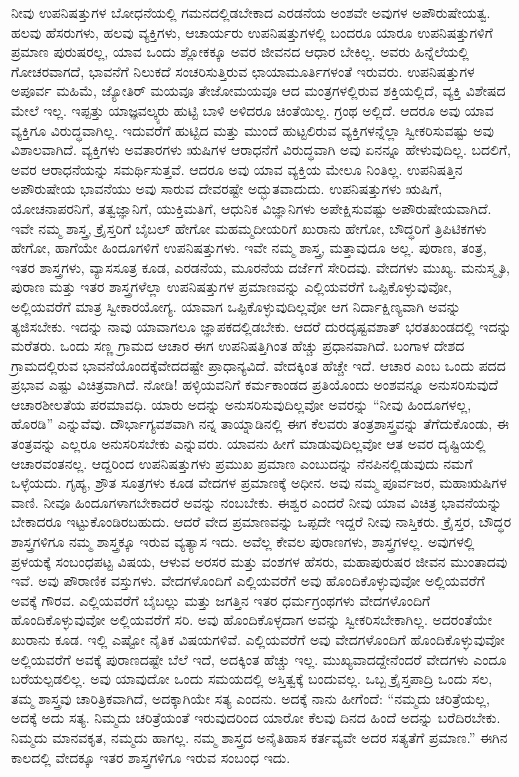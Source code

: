ನೀವು ಉಪನಿಷತ್ತುಗಳ ಬೋಧನೆಯಲ್ಲಿ ಗಮನದಲ್ಲಿಡಬೇಕಾದ ಎರಡನೆಯ ಅಂಶವೇ ಅವುಗಳ ಅಪೌರುಷೇಯತ್ವ. ಹಲವು ಹೆಸರುಗಳು, ಹಲವು ವ್ಯಕ್ತಿಗಳು, ಆಚಾರ್ಯರು ಉಪನಿಷತ್ತುಗಳಲ್ಲಿ ಬಂದರೂ ಯಾರೂ ಉಪನಿಷತ್ತುಗಳಿಗೆ ಪ್ರಮಾಣ ಪುರುಷರಲ್ಲ, ಯಾವ ಒಂದು ಶ್ಲೋಕಕ್ಕೂ ಅವರ ಜೀವನದ ಆಧಾರ ಬೇಕಿಲ್ಲ. ಅವರು ಹಿನ್ನೆಲೆಯಲ್ಲಿ ಗೋಚರವಾಗದೆ, ಭಾವನೆಗೆ ನಿಲುಕದೆ ಸಂಚರಿಸುತ್ತಿರುವ ಛಾಯಾಮೂರ್ತಿಗಳಂತೆ ಇರುವರು. ಉಪನಿಷತ್ತುಗಳ ಅಪೂರ್ವ ಮಹಿಮೆ, ಜ್ಯೋತಿರ್ ಮಯವೂ ತೇಜೋಮಯವೂ ಆದ ಮಂತ್ರಗಳಲ್ಲಿರುವ ಶಕ್ತಿಯಲ್ಲಿದೆ, ವ್ಯಕ್ತಿ ವಿಶೇಷದ ಮೇಲೆ ಇಲ್ಲ. ಇಪ್ಪತ್ತು ಯಾಜ್ಞವಲ್ಕ್ಯರು ಹುಟ್ಟಿ ಬಾಳಿ ಅಳಿದರೂ ಚಿಂತೆಯಿಲ್ಲ. ಗ್ರಂಥ ಅಲ್ಲಿದೆ. ಆದರೂ ಅವು ಯಾವ ವ್ಯಕ್ತಿಗೂ ವಿರುದ್ಧವಾಗಿಲ್ಲ. ಇದುವರೆಗೆ ಹುಟ್ಟಿದ ಮತ್ತು ಮುಂದೆ ಹುಟ್ಟಲಿರುವ ವ್ಯಕ್ತಿಗಳನ್ನೆಲ್ಲಾ ಸ್ವೀಕರಿಸುವಷ್ಟು ಅವು ವಿಶಾಲವಾಗಿದೆ. ವ್ಯಕ್ತಿಗಳು ಅವತಾರಗಳು ಋಷಿಗಳ ಆರಾಧನೆಗೆ ವಿರುದ್ಧವಾಗಿ ಅವು ಏನನ್ನೂ ಹೇಳುವುದಿಲ್ಲ. ಬದಲಿಗೆ, ಅವರ ಆರಾಧನೆಯನ್ನು ಸಮರ್ಥಿಸುತ್ತವೆ. ಆದರೂ ಅವು ಯಾವ ವ್ಯಕ್ತಿಯ ಮೇಲೂ ನಿಂತಿಲ್ಲ. ಉಪನಿಷತ್ತಿನ ಅಪೌರುಷೇಯ ಭಾವನೆಯು ಅವು ಸಾರುವ ದೇವರಷ್ಟೇ ಅದ್ಭುತವಾದುದು. ಉಪನಿಷತ್ತುಗಳು ಋಷಿಗೆ, ಯೋಚನಾಪರನಿಗೆ, ತತ್ವಜ್ಞಾನಿಗೆ, ಯುಕ್ತಿಮತಿಗೆ, ಆಧುನಿಕ ವಿಜ್ಞಾನಿಗಳು ಅಪೇಕ್ಷಿಸುವಷ್ಟು ಅಪೌರುಷೇಯವಾಗಿದೆ. ಇವೇ ನಮ್ಮ ಶಾಸ್ತ್ರ, ಕ್ರೈಸ್ತರಿಗೆ ಬೈಬಲ್​ ಹೇಗೋ ಮಹಮ್ಮದೀಯರಿಗೆ ಖುರಾನು ಹೇಗೋ, ಬೌದ್ಧರಿಗೆ ತ್ರಿಪಿಟಿಕಗಳು ಹೇಗೋ, ಹಾಗೆಯೇ ಹಿಂದೂಗಳಿಗೆ ಉಪನಿಷತ್ತುಗಳು. ಇವೇ ನಮ್ಮ ಶಾಸ್ತ್ರ, ಮತ್ತಾವುದೂ ಅಲ್ಲ. ಪುರಾಣ, ತಂತ್ರ, ಇತರ ಶಾಸ್ತ್ರಗಳು, ವ್ಯಾಸಸೂತ್ರ ಕೂಡ, ಎರಡನೆಯ, ಮೂರನೆಯ ದರ್ಜೆಗೆ ಸೇರಿದವು. ವೇದಗಳು ಮುಖ್ಯ. ಮನುಸ್ಮೃತಿ, ಪುರಾಣ ಮತ್ತು ಇತರ ಶಾಸ್ತ್ರಗಳೆಲ್ಲಾ ಉಪನಿಷತ್ತುಗಳ ಪ್ರಮಾಣವನ್ನು ಎಲ್ಲಿಯವರೆಗೆ ಒಪ್ಪಿಕೊಳ್ಳುವುವೋ, ಅಲ್ಲಿಯವರೆಗೆ ಮಾತ್ರ ಸ್ವೀಕಾರಯೋಗ್ಯ. ಯಾವಾಗ ಒಪ್ಪಿಕೊಳ್ಳುವುದಿಲ್ಲವೋ ಆಗ ನಿರ್ದಾಕ್ಷಿಣ್ಯವಾಗಿ ಅವನ್ನು ತ್ಯಜಿಸಬೇಕು. ಇದನ್ನು ನಾವು ಯಾವಾಗಲೂ ಜ್ಞಾಪಕದಲ್ಲಿಡಬೇಕು. ಆದರೆ ದುರದೃಷ್ಟವಶಾತ್​ ಭರತಖಂಡದಲ್ಲಿ ಇದನ್ನು ಮರೆತರು. ಒಂದು ಸಣ್ಣ ಗ್ರಾಮದ ಆಚಾರ ಈಗ ಉಪನಿಷತ್ತಿಗಿಂತ ಹೆಚ್ಚು ಪ್ರಧಾನವಾಗಿದೆ. ಬಂಗಾಳ ದೇಶದ ಗ್ರಾಮದಲ್ಲಿರುವ ಭಾವನೆಯೊಂದಕ್ಕೆ\break ವೇದದಷ್ಟೇ ಪ್ರಾಧಾನ್ಯವಿದೆ. ವೇದಕ್ಕಿಂತ ಹೆಚ್ಚೇ ಇದೆ. ಆಚಾರ ಎಂಬ ಒಂದು ಪದದ ಪ್ರಭಾವ ಎಷ್ಟು ವಿಚಿತ್ರವಾಗಿದೆ. ನೋಡಿ! ಹಳ್ಳಿಯವನಿಗೆ ಕರ್ಮಕಾಂಡದ ಪ್ರತಿಯೊಂದು ಅಂಶವನ್ನೂ ಅನುಸರಿಸುವುದೆ ಆಚಾರಶೀಲತೆಯ ಪರಮಾವಧಿ. ಯಾರು ಅದನ್ನು ಅನು\break ಸರಿಸುವುದಿಲ್ಲವೋ ಅವರನ್ನು “ನೀವು ಹಿಂದೂಗಳಲ್ಲ, ಹೊರಡಿ” ಎನ್ನುವೆವು. ದೌರ್ಭಾಗ್ಯವಶವಾಗಿ ನನ್ನ ತಾಯ್ನಾಡಿನಲ್ಲಿ ಈಗ ಕೆಲವರು ತಂತ್ರಶಾಸ್ತ್ರವನ್ನು ತೆಗೆದುಕೊಂಡು, ಈ ತಂತ್ರವನ್ನು ಎಲ್ಲರೂ ಅನುಸರಿಸಬೇಕು ಎನ್ನುವರು. ಯಾವನು ಹೀಗೆ ಮಾಡುವುದಿಲ್ಲವೋ ಆತ ಅವರ ದೃಷ್ಟಿಯಲ್ಲಿ ಆಚಾರವಂತನಲ್ಲ. ಆದ್ದರಿಂದ ಉಪನಿಷತ್ತುಗಳು ಪ್ರಮುಖ ಪ್ರಮಾಣ ಎಂಬುದನ್ನು ನೆನಪಿನಲ್ಲಿಡುವುದು ನಮಗೆ ಒಳ್ಳೆಯದು. ಗೃಹ್ಯ, ಶ್ರೌತ ಸೂತ್ರಗಳು ಕೂಡ ವೇದಗಳ ಪ್ರಮಾಣಕ್ಕೆ ಅಧೀನ. ಅವು ನಮ್ಮ ಪೂರ್ವಜರ, ಮಹಾಋಷಿಗಳ ವಾಣಿ. ನೀವೂ ಹಿಂದೂಗಳಾಗಬೇಕಾದರೆ ಅವನ್ನು ನಂಬಬೇಕು. ಈಶ್ವರ ಎಂದರೆ ನೀವು ಯಾವ ವಿಚಿತ್ರ ಭಾವನೆಯನ್ನು ಬೇಕಾದರೂ ಇಟ್ಟುಕೊಂಡಿರಬಹುದು. ಆದರೆ ವೇದ ಪ್ರಮಾಣವನ್ನು ಒಪ್ಪದೇ ಇದ್ದರೆ ನೀವು ನಾಸ್ತಿಕರು. ಕ್ರೈಸ್ತರ, ಬೌದ್ಧರ ಶಾಸ್ತ್ರಗಳಿಗೂ ನಮ್ಮ ಶಾಸ್ತ್ರಕ್ಕೂ ಇರುವ ವ್ಯತ್ಯಾಸ ಇದು. ಅವೆಲ್ಲ ಕೇವಲ ಪುರಾಣಗಳು, ಶಾಸ್ತ್ರಗಳಲ್ಲ. ಅವುಗಳಲ್ಲಿ ಪ್ರಳಯಕ್ಕೆ ಸಂಬಂಧಪಟ್ಟ ವಿಷಯ, ಆಳುವ ಅರಸರ ಮತ್ತು ವಂಶಗಳ ಹೆಸರು, ಮಹಾಪುರುಷರ ಜೀವನ ಮುಂತಾದವು ಇವೆ. ಅವು ಪೌರಾಣಿಕ ವಸ್ತುಗಳು. ವೇದಗಳೊಂದಿಗೆ ಎಲ್ಲಿಯವರೆಗೆ ಅವು ಹೊಂದಿಕೊಳ್ಳುವುವೋ ಅಲ್ಲಿಯವರೆಗೆ ಅವಕ್ಕೆ ಗೌರವ. ಎಲ್ಲಿಯವರೆಗೆ ಬೈಬಲ್ಲು ಮತ್ತು ಜಗತ್ತಿನ ಇತರ ಧರ್ಮಗ್ರಂಥಗಳು ವೇದಗಳೊಂದಿಗೆ ಹೊಂದಿಕೊಳ್ಳುವುವೋ ಅಲ್ಲಿಯವರೆಗೆ ಸರಿ. ಅವು ಹೊಂದಿಕೊಳ್ಳದಾಗ ಅವನ್ನು ಸ್ವೀಕರಿಸಬೇಕಾಗಿಲ್ಲ. ಅದರಂತೆಯೇ ಖುರಾನು ಕೂಡ. ಇಲ್ಲಿ ಎಷ್ಟೋ ನೈತಿಕ ವಿಷಯಗಳಿವೆ. ಎಲ್ಲಿಯವರೆಗೆ ಅವು ವೇದಗಳೊಂದಿಗೆ ಹೊಂದಿಕೊಳ್ಳುವುವೋ ಅಲ್ಲಿಯವರೆಗೆ ಅವಕ್ಕೆ ಪುರಾಣದಷ್ಟೇ ಬೆಲೆ ಇದೆ, ಅದಕ್ಕಿಂತ ಹೆಚ್ಚು ಇಲ್ಲ. ಮುಖ್ಯವಾದದ್ದೇನೆಂದರೆ ವೇದಗಳು ಎಂದೂ ಬರೆಯಲ್ಪಡಲಿಲ್ಲ. ಅವು ಯಾವುದೋ ಒಂದು ಸಮಯದಲ್ಲಿ ಅಸ್ತಿತ್ವಕ್ಕೆ ಬಂದುವಲ್ಲ. ಒಬ್ಬ ಕ್ರೈಸ್ತಪಾದ್ರಿ ಒಂದು ಸಲ, ತಮ್ಮ ಶಾಸ್ತ್ರವು ಚಾರಿತ್ರಿಕವಾಗಿದೆ, ಅದಕ್ಕಾಗಿಯೇ ಸತ್ಯ ಎಂದನು. ಅದಕ್ಕೆ ನಾನು ಹೀಗೆಂದೆ: “ನಮ್ಮದು ಚರಿತ್ರೆಯಲ್ಲ, ಅದಕ್ಕೆ ಅದು ಸತ್ಯ. ನಿಮ್ಮದು ಚರಿತ್ರೆಯಂತೆ ಇರುವುದರಿಂದ ಯಾರೋ ಕೆಲವು ದಿನದ ಹಿಂದೆ ಅದನ್ನು ಬರೆದಿರಬೇಕು. ನಿಮ್ಮದು ಮಾನವಕೃತ, ನಮ್ಮದು ಹಾಗಲ್ಲ. ನಮ್ಮ ಶಾಸ್ತ್ರದ ಅನೈತಿಹಾಸ ಕರ್ತವ್ಯವೇ ಅದರ ಸತ್ಯತೆಗೆ ಪ್ರಮಾಣ.” ಈಗಿನ ಕಾಲದಲ್ಲಿ ವೇದಕ್ಕೂ ಇತರ ಶಾಸ್ತ್ರಗಳಿಗೂ ಇರುವ ಸಂಬಂಧ ಇದು.


